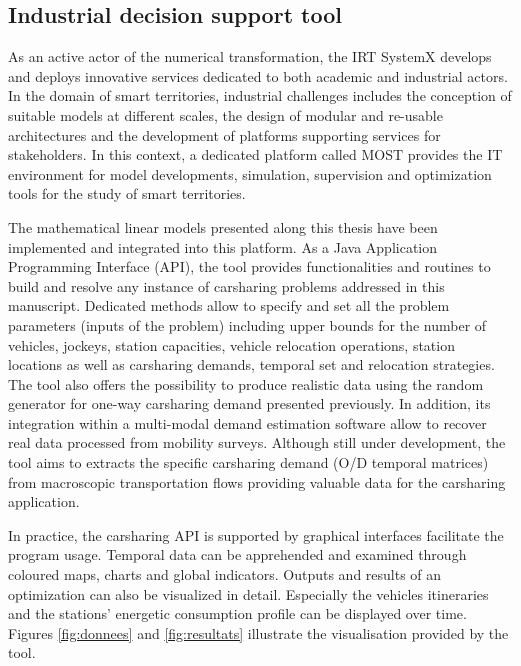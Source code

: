 
\newpage
\subsection{Industrial decision support tool}

As an active actor of the numerical transformation, the IRT SystemX develops and deploys innovative services dedicated to both academic and industrial actors.
In the domain of smart territories, industrial challenges includes the conception of suitable models at different scales, the design of modular and re-usable architectures and the development of platforms supporting services for stakeholders.
In this context, a dedicated platform called MOST provides the IT environment for model developments, simulation, supervision and optimization tools for the study of smart territories.

\medskip
The mathematical linear models presented along this thesis have been implemented and integrated into this platform.
As a Java Application Programming Interface (API), the tool provides functionalities and routines to build and resolve any instance of carsharing problems addressed in this manuscript.
Dedicated methods allow to specify and set all the problem parameters (inputs of the problem) including upper bounds for the number of vehicles, jockeys, station capacities, vehicle relocation operations, station locations as well as carsharing demands, temporal set and relocation strategies.
The tool also offers the possibility to produce realistic data using the random generator for one-way carsharing demand presented previously.
In addition, its integration within a multi-modal demand estimation software allow to recover real data processed from mobility surveys.
Although still under development, the tool aims to extracts the specific carsharing demand (O/D temporal matrices) from macroscopic transportation flows providing valuable data for the carsharing application.

\medskip
In practice, the carsharing API is supported by graphical interfaces facilitate the program usage.
Temporal data can be apprehended and examined through coloured maps, charts and global indicators.
Outputs and results of an optimization can also be visualized in detail.
Especially the vehicles itineraries and the stations' energetic consumption profile can be displayed over time.
Figures \ref{fig:donnees} and \ref{fig:resultats} illustrate the visualisation provided by the tool.

